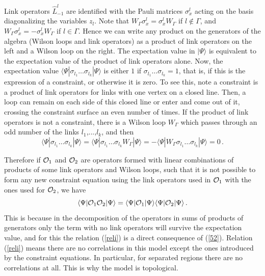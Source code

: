 \documentclass[12pt,a4paper]{article}
\newcommand{\be}{\begin{equation}}
\newcommand{\ee}{\end{equation}}
\def\be{\begin{equation}}
\def\ee{\end{equation}}
\begin{document}
Link operators $\hat{L}^l_{-1}$ are identified with the Pauli matrices $\sigma_x^l$ acting on the basis diagonalizing the variables $z_l$. Note that $W_\Gamma \sigma_x^l=\sigma_x^l W_\Gamma$ if $l\notin \Gamma$, and $W_\Gamma \sigma_x^l=-\sigma_x^l W_\Gamma$ if $l\in \Gamma$. Hence 
we can write any product on the generators of the algebra (Wilson loops and link operators) as a product of link operators on the left and a 
Wilson loop on the right. The expectation value in $|\Psi\rangle$ is equivalent to the expectation value of the product of link operators alone. 
Now, the expectation value $\langle\Psi|\sigma_{l_1}\hdots\sigma_{l_k}|\Psi\rangle $ 
is either $1$ if $\sigma_{l_1}\hdots\sigma_{l_k}=1$, that is, if this is the expression of a constraint, or otherwise it is zero. To see this, 
note a constraint is a product of link operators for links with one vertex on a closed line. Then, a loop can remain on each side of this 
closed line or enter and come out of it, crossing the constraint surface an even number of times. If the product of link operators is not a 
constraint, there is a Wilson loop $W_\Gamma$ which passes through an odd number of the links $l_1$,...,$l_k$, and then
\be
\langle\Psi|\sigma_{l_1}\hdots\sigma_{l_k}|\Psi\rangle=\langle\Psi|\sigma_{l_1}\hdots\sigma_{l_k}W_\Gamma|\Psi\rangle=-\langle\Psi|W_\Gamma\sigma_{l_1}\hdots\sigma_{l_k}|\Psi\rangle=0\,.
\ee

Therefore if ${\cal O}_1$ and ${\cal O}_2$ are operators formed with linear combinations of products of some link operators and Wilson loops, 
 such that it is not possible to form any new constraint equation using the link operators used in ${\cal O}_1$ with the ones used for ${\cal O}_2$, we have 
\be
\langle \Psi|{\cal O}_1{\cal O}_2|\Psi\rangle=\langle \Psi|{\cal O}_1|\Psi\rangle\langle\Psi|{\cal O}_2|\Psi\rangle\,.\label{reli}
\ee  
This is because in the decomposition of the operators in sums of products of generators only the term with no link operators will survive 
the expectation value, and for this the relation (\ref{reli}) is a direct consequence of (\ref{52}). Relation (\ref{reli}) means there are 
no correlations in this model except the ones introduced by the constraint equations. In particular, for separated regions there are no 
correlations at all. This is why the model is topological.
\end{document}
